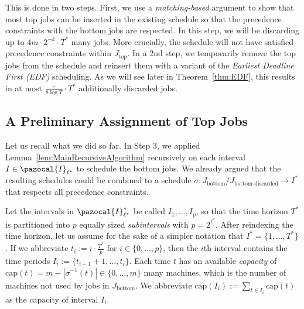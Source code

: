 \documentclass[11pt,letterpaper,oneside,english]{article}
\theoremstyle{theorem}
\begin{document}
This is done in two steps.
First, we use a \emph{matching-based} argument to show that most top jobs can be inserted 
in the existing schedule so that
the precedence constraints with the bottom jobs are respected. In this step, we will be 
discarding up to  $4m \cdot 2^{-k} \cdot T^*$ many jobs. More crucially, the schedule
will not have satisfied precedence constraints within $J_{\textrm{top}}$.
In a 2nd step, we temporarily remove the top jobs from the schedule and reinsert them 
with a variant of the \emph{Earliest Deadline First (EDF)} scheduling. As we will see later in Theorem~\ref{thm:EDF}, this results in at most 
 $\frac{\varepsilon}{8\log T} \cdot T^*$ additionally discarded jobs. 


\subsection{A Preliminary Assignment of Top Jobs}









Let us recall what we did so far. In Step 3, we applied Lemma~\ref{lem:MainRecursiveAlgorithm} 
recursively on each interval $I \in \pazocal{I}_{\ell^*}$ to schedule the bottom jobs. We already
argued that the resulting schedules could be combined to a schedule 
$\sigma : J_{\textrm{bottom}} / J_{\textrm{bottom-discarded}} \to I^*$ that respects all precedence
constraints. 


Let the intervals in $\pazocal{I}_{\ell^*}^*$ be called $I_1,\ldots,I_p$, so that  the time horizon $T^*$ is partitioned into
$p$ equally sized
\emph{subintervals} with $p = 2^{\ell^*}$. After reindexing the time horizon, let us assume for the
sake of a simpler notation that $I^* = \{ 1,\ldots,T^*\}$. If we abbreviate $t_i := i \cdot
\frac{T^*}{p}$ for $i \in \{ 0,\ldots,p\}$,
then the $i$th interval contains the time periods $I_i := \{
t_{i-1}+1,\ldots,t_i\}$.
Each time $t$ has an available \emph{capacity} of $\textrm{cap}(t) = m-|\sigma^{-1}(t)| \in \{ 0,\ldots,m\}$ many machines, which is the number of machines not used by jobs in $J_{\textrm{bottom}}$.
We abbreviate $\textrm{cap}(I_i) := \sum_{t \in I_i} \textrm{cap}(t)$ as
the capacity of interval $I_i$.
\end{document}
